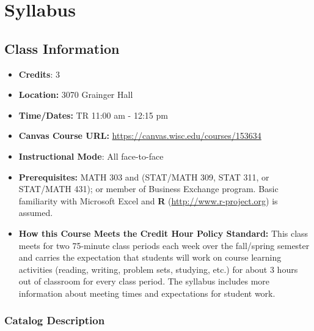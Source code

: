 \documentclass[11pt,fleqn,oneside]{book}
\begin{document}



\mainmatter     %

\renewcommand*{\thechapter}{\arabic{chapter}} %
\renewcommand*{\thesection}{\thechapter.\arabic{section}} %

\chapter{Syllabus}

\section*{Class Information}
\begin{itemize}
\item \textbf{Credits}: 3
\item \textbf{Location:} 3070 Grainger Hall
\item \textbf{Time/Dates:}  TR 11:00 am - 12:15 pm
\item  \textbf{Canvas Course URL:}  \url{https://canvas.wisc.edu/courses/153634}
\item \textbf{Instructional Mode}: All face-to-face 
 \item  \textbf{Prerequisites:} MATH 303 and (STAT/MATH  309, STAT 311, or STAT/MATH  431); or member of Business Exchange program.  Basic familiarity with Microsoft Excel and \textbf{R} (\url{http://www.r-project.org}) is assumed.  
 \item \textbf{How this Course Meets the Credit Hour Policy Standard:} This class meets for two 75-minute class periods each week over the fall/spring semester and carries the expectation that students will work on course learning activities (reading, writing, problem sets, studying, etc.) for about 3 hours out of classroom for every class period. The syllabus includes more information about meeting times and expectations for student work. 
\end{itemize}

\subsection*{Catalog Description}
\end{document}
